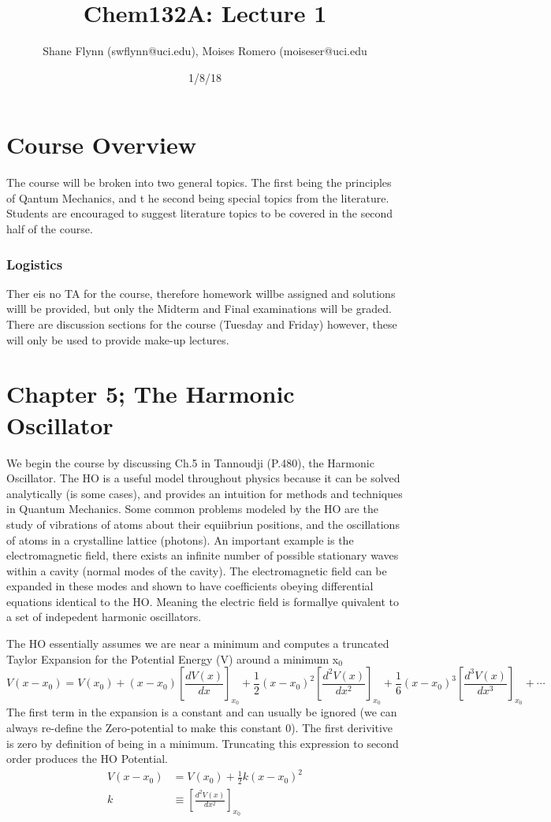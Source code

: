 \documentclass{article}
\title{Chem132A: Lecture 1}
\author{Shane Flynn (swflynn@uci.edu), Moises Romero (moiseser@uci.edu}
\date{1/8/18}
\newcommand{\be}{\begin{equation}}
\newcommand{\ee}{\end{equation}}
\begin{document}
\maketitle

\section*{Course Overview}
The course will be broken into two general topics.
The first being the principles of Qantum Mechanics, and t he second being special topics from the literature. 
Students are encouraged to suggest  literature topics to be covered in the second half of the course. 

\subsubsection*{Logistics}
Ther eis no TA for the course, therefore homework willbe assigned and solutions willl be provided, but only the Midterm and Final examinations will be graded.
There are discussion sections for the course (Tuesday and Friday) however, these will only be used to provide make-up lectures. 

\section*{Chapter 5; The Harmonic Oscillator}
We begin the course by discussing Ch.5 in Tannoudji (P.480), the Harmonic Oscillator. 
The HO is a useful model throughout physics because it can be solved analytically (is some cases), and provides an intuition for methods and techniques in Quantum Mechanics. 
Some common problems modeled by the HO are the study of vibrations of atoms about their equiibriun positions, and the oscillations of atoms in a crystalline lattice (photons).
An important example is the electromagnetic field, there  exists an  infinite number of possible stationary waves within a cavity (normal modes of the cavity).
The electromagnetic field can be expanded in these modes and shown to have coefficients obeying differential equations identical to the HO. 
Meaning the electric field is formallye quivalent to a set of indepedent harmonic oscillators. 

The HO essentially assumes we are near a minimum and computes a truncated Taylor Expansion for the Potential Energy (V) around a minimum x$_0$
\be
V(x - x_0) = V(x_0)  + (x-x_0) \left[\frac{dV(x)}{dx}\right]_{x_0} + \frac{1}{2}(x-x_0)^2  \left[\frac{d^2V(x)}{dx^2}\right]_{x_0} + \frac{1}{6} (x-x_0)^3  \left[\frac{d^3V(x)}{dx^3}\right]_{x_0} + \cdots
\ee
The first term in the expansion is a constant and can usually be ignored (we can always re-define the Zero-potential to make this constant 0).
The first derivitive is zero by definition of being in a minimum.
Truncating this expression to second order produces the HO Potential.
\be
\begin{split}
    V(x-x_0) &= V(x_0) +  \frac{1}{2}k(x-x_0)^2\\
    k &\equiv \left[\frac{d^2V(x)}{dx^2}\right]_{x_0}
\end{split}
\ee
\end{document}
